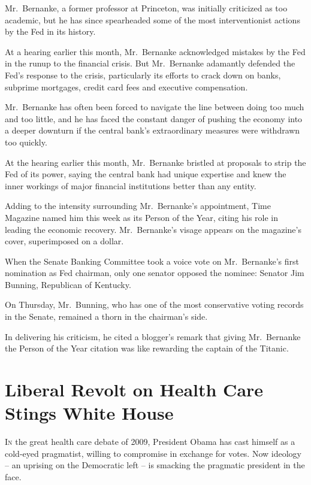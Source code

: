 ﻿\documentclass[12pt]{article}
\begin{document}
Mr.~Bernanke, a former professor at Princeton, was initially criticized as too academic, but he has
since spearheaded some of the most interventionist actions by the Fed in its history.

At a hearing earlier this month, Mr.~Bernanke acknowledged mistakes by the Fed in the runup to the
financial crisis. But Mr.~Bernanke adamantly defended the Fed's response to the crisis, particularly
its efforts to crack down on banks, subprime mortgages, credit card fees and executive compensation.

Mr.~Bernanke has often been forced to navigate the line between doing too much and too little, and
he has faced the constant danger of pushing the economy into a deeper downturn if the central bank's
extraordinary measures were withdrawn too quickly.

At the hearing earlier this month, Mr.~Bernanke bristled at proposals to strip the Fed of its power,
saying the central bank had unique expertise and knew the inner workings of major financial
institutions better than any entity.

Adding to the intensity surrounding Mr.~Bernanke's appointment, Time Magazine named him this week as
its Person of the Year, citing his role in leading the economic recovery. Mr.~Bernanke's visage
appears on the magazine's cover, superimposed on a dollar.

When the Senate Banking Committee took a voice vote on Mr.~Bernanke's first nomination as Fed
chairman, only one senator opposed the nominee: Senator Jim Bunning, Republican of Kentucky.

On Thursday, Mr.~Bunning, who has one of the most conservative voting records in the Senate,
remained a thorn in the chairman's side.

In delivering his criticism, he cited a blogger's remark that giving Mr.~Bernanke the Person of the
Year citation was like rewarding the captain of the Titanic.

\section{Liberal Revolt on Health Care Stings White House}

\lettrine{I}{n} the great health care debate of 2009, President Obama has
cast himself as a cold-eyed pragmatist, willing to compromise in exchange for votes. Now ideology --
an uprising on the Democratic left -- is smacking the pragmatic president in the face.
\end{document}
